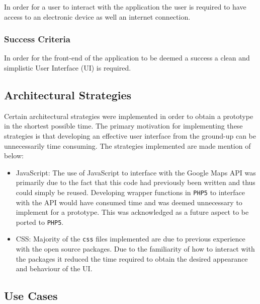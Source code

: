 \documentclass[10pt,twocolumn]{witseiepaper}
\begin{document}
			In order for a user to interact with the application the user is required to have access to an electronic device as well an internet connection. 
			
		\subsubsection{Success Criteria}
		
			In order for the front-end of the application to be deemed a success a clean and simplistic User Interface (UI) is required. 
			
	\subsection{Architectural Strategies}
	
		Certain architectural strategies were implemented in order to obtain a prototype in the shortest possible time. The primary motivation for implementing these strategies is that developing an effective user interface from the ground-up can be unnecessarily time consuming. The strategies implemented are made mention of below:
		
		\begin{itemize}
			\item JavaScript: The use of JavaScript to interface with the Google Maps API was primarily due to the fact that this code had previously been written and thus could simply be reused. Developing wrapper functions in \texttt{PHP5} to interface with the API would have consumed time and was deemed unnecessary to implement for a prototype. This was acknowledged as a future aspect to be ported to \texttt{PHP5}.
			\item CSS: Majority of the \texttt{css} files implemented are due to previous experience with the open source packages. Due to the familiarity of how to interact with the packages it reduced the time required to obtain the desired appearance and behaviour of the UI.
		\end{itemize}
		
	\subsection{Use Cases}
	
\end{document}
